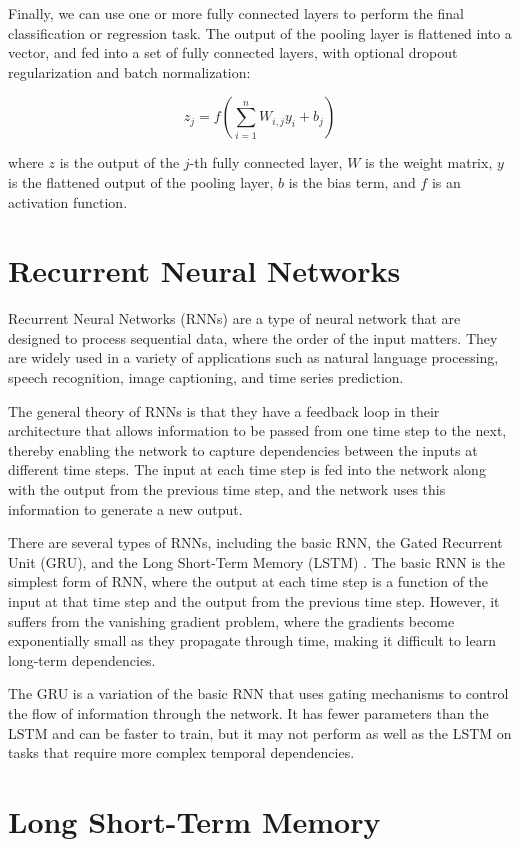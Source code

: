 Finally, we can use one or more fully connected layers to perform the final classification or regression task. The output of the pooling layer is flattened into a vector, and fed into a set of fully connected layers, with optional dropout regularization and batch normalization:

$$z_j = f(\sum_{i=1}^n W_{i,j} y_i + b_j)$$

where $z$ is the output of the $j$-th fully connected layer, $W$ is the weight matrix, $y$ is the flattened output of the pooling layer, $b$ is the bias term, and $f$ is an activation function. 

\section{Recurrent Neural Networks}
\label{sec:3_rnns}

Recurrent Neural Networks (RNNs) are a type of neural network that are designed to process sequential data, where the order of the input matters. They are widely used in a variety of applications such as natural language processing, speech recognition, image captioning, and time series prediction.

The general theory of RNNs is that they have a feedback loop in their architecture that allows information to be passed from one time step to the next, thereby enabling the network to capture dependencies between the inputs at different time steps. The input at each time step is fed into the network along with the output from the previous time step, and the network uses this information to generate a new output.

There are several types of RNNs, including the basic RNN, the Gated Recurrent Unit (GRU), and the Long Short-Term Memory (LSTM) \cite{hochreiter1997long}. The basic RNN is the simplest form of RNN, where the output at each time step is a function of the input at that time step and the output from the previous time step. However, it suffers from the vanishing gradient problem, where the gradients become exponentially small as they propagate through time, making it difficult to learn long-term dependencies.

The GRU is a variation of the basic RNN that uses gating mechanisms to control the flow of information through the network. It has fewer parameters than the LSTM and can be faster to train, but it may not perform as well as the LSTM on tasks that require more complex temporal dependencies.

\section{Long Short-Term Memory}
\label{sec:3_LSTMs}

